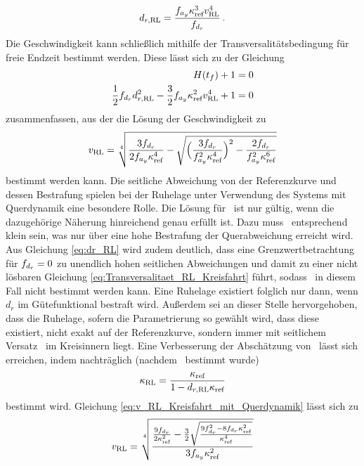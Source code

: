 \begin{equation}
d_{r,\textrm{RL}} = \frac{f_{a_y}\kappa_{\textrm{ref}}^3v_{\textrm{RL}}^4}{f_{d_r}}\,.
\end{equation}
Die Geschwindigkeit kann schließlich mithilfe der Transversalitätsbedingung für freie Endzeit bestimmt werden. Diese lässt sich zu der Gleichung
\begin{align}
H(t_f) + 1 &= 0\\
\frac{1}{2}f_{d_r}d_{r,\textrm{RL}}^2 - \frac{3}{2}f_{a_y}\kappa_{\textrm{ref}}^2v_{\textrm{RL}}^4 + 1 &= 0 \label{eq:Transversalitaet_RL_Kreisfahrt}
\end{align}
zusammenfassen, aus der die Lösung der Geschwindigkeit zu 
\begin{equation}
v_{\textrm{RL}} = \sqrt[4]{\frac{3f_{d_r}}{2f_{a_y}\kappa_{\textrm{ref}}^4}-\sqrt{\Big(\frac{3f_{d_r}}{f_{a_y}^2\kappa_{\textrm{ref}}^4}\Big)^2 - \frac{2f_{d_r}}{f_{a_y}^2\kappa_{\textrm{ref}}^6}}} \label{eq:v_RL_Kreisfahrt_mit_Querdynamik}
\end{equation}
bestimmt werden kann. Die seitliche Abweichung von der Referenzkurve und dessen Bestrafung spielen bei der Ruhelage unter Verwendung des Systems mit Querdynamik eine besondere Rolle. Die Lösung für \kappaRL~ist nur gültig, wenn die dazugehörige Näherung hinreichend genau erfüllt ist. Dazu muss \drRL~entsprechend klein sein, was nur über eine hohe Bestrafung der Querabweichung erreicht wird. Aus Gleichung \eqref{eq:dr_RL} wird zudem deutlich, dass eine Grenzwertbetrachtung für $f_{d_r}=0$ zu unendlich hohen seitlichen Abweichungen und damit zu einer nicht lösbaren Gleichung \eqref{eq:Transversalitaet_RL_Kreisfahrt} führt, sodass \vRL~in diesem Fall nicht bestimmt werden kann. Eine Ruhelage existiert folglich nur dann, wenn $d_r$ im Gütefunktional bestraft wird. Außerdem sei an dieser Stelle hervorgehoben, dass die Ruhelage, sofern die Parametrierung so gewählt wird, dass diese existiert, nicht exakt auf der Referenzkurve, sondern immer mit seitlichem Versatz \drRL~im Kreisinnern liegt. Eine Verbesserung der Abschätzung von \kappaRL~lässt sich erreichen, indem nachträglich (nachdem \drRL~bestimmt wurde)
\begin{equation}
\kappa_{\textrm{RL}} = \frac{\kappa_{\textrm{ref}}}{1-d_{r,\textrm{RL}}\kappa_{\textrm{ref}}} \label{eq:kappaRL_exakt}
\end{equation}
bestimmt wird. Gleichung \eqref{eq:v_RL_Kreisfahrt_mit_Querdynamik} lässt sich zu 
\begin{equation}
v_{\textrm{RL}} = \sqrt[4]{\frac{\frac{9f_{d_r}}{2\kappa_{\textrm{ref}}^2}-\frac{3}{2}\sqrt{\frac{9f_{d_r}^2-8f_{d_r}\kappa_{\textrm{ref}}^2}{\kappa_{\textrm{ref}}^4}}}{3f_{a_y}\kappa_{\textrm{ref}}^2}} \label{eq:v_RL_Kreisfahrt_mit_Querdynamik_umform}
\end{equation}
